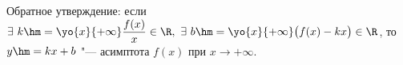 
  Обратное утверждение: если $\exists\  k\hm=\yo{x}{+\infty}\dfrac{f(x)}x\in\R,\ \exists\  b\hm=\yo{x}{+\infty}\big(f(x)-kx\big)\in\R$, то
  $y\hm=kx+b$ "--- асимптота $f(x)$ при $x\to+\infty$.
